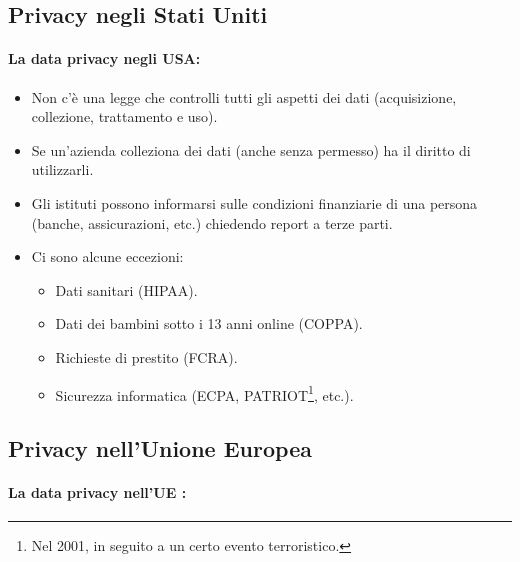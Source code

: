 \subsection{Privacy negli Stati Uniti}

\paragraph{La data privacy  negli USA:}

\begin{itemize}
  \item Non c'è una legge che controlli tutti gli aspetti dei dati (acquisizione, collezione, trattamento e uso). 
  \item Se un'azienda colleziona dei dati (anche senza permesso) ha il diritto di utilizzarli. 
  \item Gli istituti possono informarsi sulle condizioni finanziarie di una persona (banche, assicurazioni, etc.) chiedendo report a terze parti.
  \item Ci sono alcune eccezioni:
    \begin{itemize}
      \item Dati sanitari (HIPAA). 
      \item Dati dei bambini sotto i 13 anni online (COPPA).
      \item Richieste di prestito (FCRA). 
      \item Sicurezza informatica (ECPA, PATRIOT\footnote{Nel 2001, in seguito a un certo evento terroristico.}, etc.).
    \end{itemize}
\end{itemize}

\subsection{Privacy nell'Unione Europea}

\paragraph{La data privacy nell'UE :}

